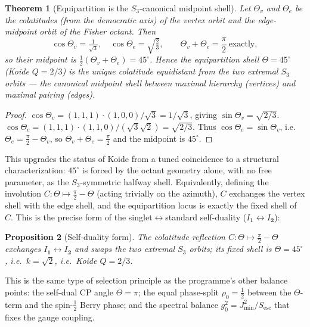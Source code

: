 \documentclass[12pt]{article}
\newtheorem{theorem}{Theorem}[section]
\newtheorem{proposition}[theorem]{Proposition}
\theoremstyle{definition}
\theoremstyle{remark}
\begin{document}
\begin{theorem}[Equipartition is the $S_3$-canonical midpoint shell]
\label{thm:midpoint}
Let $\Theta_v$ and $\Theta_e$ be the colatitudes (from the democratic axis) of
the vertex orbit and the edge-midpoint orbit of the Fisher octant. Then
\begin{equation}
\cos\Theta_v=\tfrac{1}{\sqrt3},\quad \cos\Theta_e=\sqrt{\tfrac23},\qquad
\Theta_v+\Theta_e=\frac{\pi}{2}\ \text{exactly},
\end{equation}
so their midpoint is $\tfrac12(\Theta_v+\Theta_e)=45^\circ$. Hence the
equipartition shell $\Theta=45^\circ$ (Koide $Q=2/3$) is the unique colatitude
equidistant from the two extremal $S_3$ orbits --- the canonical midpoint
shell between maximal hierarchy (vertices) and maximal pairing (edges).
\end{theorem}

\begin{proof}
$\cos\Theta_v=(1,1,1)\!\cdot\!(1,0,0)/\sqrt3=1/\sqrt3$, giving
$\sin\Theta_v=\sqrt{2/3}$. $\cos\Theta_e=(1,1,1)\!\cdot\!(1,1,0)/(\sqrt3\sqrt2)
=\sqrt{2/3}$. Thus $\cos\Theta_e=\sin\Theta_v$, i.e.\
$\Theta_e=\tfrac{\pi}{2}-\Theta_v$, so $\Theta_v+\Theta_e=\tfrac{\pi}{2}$ and
the midpoint is $45^\circ$.
\end{proof}

This upgrades the status of Koide from a tuned coincidence to a structural
characterization: $45^\circ$ is forced by the octant geometry alone, with no
free parameter, as the $S_3$-symmetric halfway shell. Equivalently, defining
the involution $C:\Theta\mapsto\tfrac{\pi}{2}-\Theta$ (acting trivially on the
azimuth), $C$ exchanges the vertex shell with the edge shell, and the
equipartition locus is exactly the fixed shell of $C$. This is the precise
form of the singlet$\leftrightarrow$standard self-duality
($I_{\mathbf 1}\leftrightarrow I_{\mathbf 2}$):

\begin{proposition}[Self-duality form]
\label{prop:selfdual}
The colatitude reflection $C:\Theta\mapsto\tfrac{\pi}{2}-\Theta$ exchanges
$I_{\mathbf 1}\leftrightarrow I_{\mathbf 2}$ and swaps the two extremal $S_3$
orbits; its fixed shell is $\Theta=45^\circ$, i.e.\ $k=\sqrt2$, i.e.\
Koide $Q=2/3$.
\end{proposition}

This is the same type of selection principle as the programme's other balance
points: the self-dual CP angle $\Theta=\pi$; the equal phase-split
$\rho_0=\tfrac12$ between the $\Theta$-term and the spin-$\tfrac12$ Berry
phase; and the spectral balance $g_0^2=J_{\min}^2/S_{\mathrm{esc}}$ that fixes
the gauge coupling.
\end{document}
